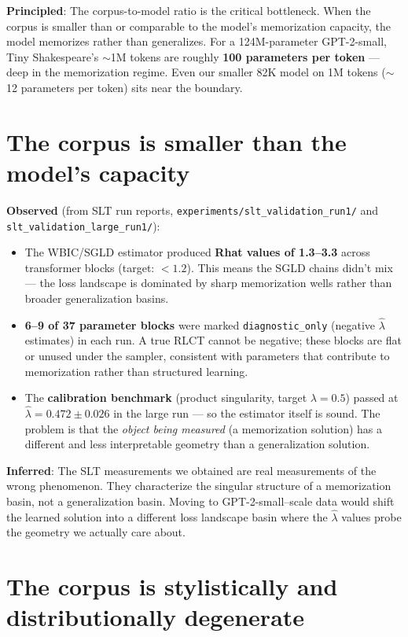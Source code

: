 \documentclass[11pt]{article}
\begin{document}
\textbf{Principled}: The corpus-to-model ratio is the critical bottleneck. When the corpus is smaller than or comparable to the model's memorization capacity, the model memorizes rather than generalizes. For a 124M-parameter GPT-2-small, Tiny Shakespeare's $\sim$1M tokens are roughly \textbf{100 parameters per token} --- deep in the memorization regime. Even our smaller 82K model on 1M tokens ($\sim$12 parameters per token) sits near the boundary.

\section{The corpus is smaller than the model's capacity}

\textbf{Observed} (from SLT run reports, \texttt{experiments/slt\_validation\_run1/} and \texttt{slt\_validation\_large\_run1/}):

\begin{itemize}[leftmargin=*]
\item The WBIC/SGLD estimator produced \textbf{Rhat values of 1.3--3.3} across transformer blocks (target: $<1.2$). This means the SGLD chains didn't mix --- the loss landscape is dominated by sharp memorization wells rather than broader generalization basins.
\item \textbf{6--9 of 37 parameter blocks} were marked \texttt{diagnostic\_only} (negative $\hat\lambda$ estimates) in each run. A true RLCT cannot be negative; these blocks are flat or unused under the sampler, consistent with parameters that contribute to memorization rather than structured learning.
\item The \textbf{calibration benchmark} (product singularity, target $\lambda=0.5$) passed at $\hat\lambda=0.472\pm0.026$ in the large run --- so the estimator itself is sound. The problem is that the \emph{object being measured} (a memorization solution) has a different and less interpretable geometry than a generalization solution.
\end{itemize}

\textbf{Inferred}: The SLT measurements we obtained are real measurements of the wrong phenomenon. They characterize the singular structure of a memorization basin, not a generalization basin. Moving to GPT-2-small--scale data would shift the learned solution into a different loss landscape basin where the $\hat\lambda$ values probe the geometry we actually care about.

\section{The corpus is stylistically and distributionally degenerate}
\end{document}
